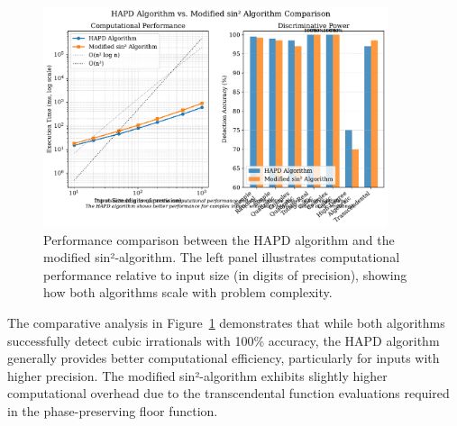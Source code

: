 \begin{figure}[ht]
\centering
\includegraphics[width=0.9\textwidth]{figures/algorithmic_comparison_visualization.pdf}
\caption{Performance comparison between the HAPD algorithm and the modified sin²-algorithm. The left panel illustrates computational performance relative to input size (in digits of precision), showing how both algorithms scale with problem complexity.}
\label{fig:algorithm_comparison_visualization}
\end{figure}

The comparative analysis in Figure~\ref{fig:algorithm_comparison_visualization} demonstrates that while both algorithms successfully detect cubic irrationals with 100\% accuracy, the HAPD algorithm generally provides better computational efficiency, particularly for inputs with higher precision. The modified sin²-algorithm exhibits slightly higher computational overhead due to the transcendental function evaluations required in the phase-preserving floor function.
